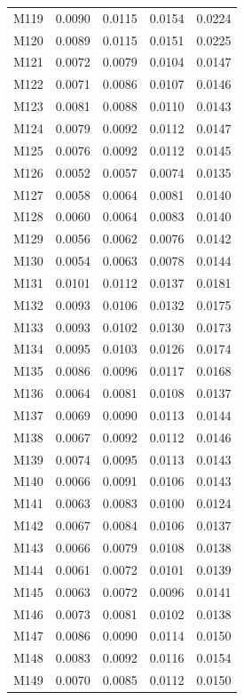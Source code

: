 \begin{longtable}{lrrrr}
M119 & 0.0090 & 0.0115 & 0.0154 & 0.0224 \\
M120 & 0.0089 & 0.0115 & 0.0151 & 0.0225 \\
M121 & 0.0072 & 0.0079 & 0.0104 & 0.0147 \\
M122 & 0.0071 & 0.0086 & 0.0107 & 0.0146 \\
M123 & 0.0081 & 0.0088 & 0.0110 & 0.0143 \\
M124 & 0.0079 & 0.0092 & 0.0112 & 0.0147 \\
M125 & 0.0076 & 0.0092 & 0.0112 & 0.0145 \\
M126 & 0.0052 & 0.0057 & 0.0074 & 0.0135 \\
M127 & 0.0058 & 0.0064 & 0.0081 & 0.0140 \\
M128 & 0.0060 & 0.0064 & 0.0083 & 0.0140 \\
M129 & 0.0056 & 0.0062 & 0.0076 & 0.0142 \\
M130 & 0.0054 & 0.0063 & 0.0078 & 0.0144 \\
M131 & 0.0101 & 0.0112 & 0.0137 & 0.0181 \\
M132 & 0.0093 & 0.0106 & 0.0132 & 0.0175 \\
M133 & 0.0093 & 0.0102 & 0.0130 & 0.0173 \\
M134 & 0.0095 & 0.0103 & 0.0126 & 0.0174 \\
M135 & 0.0086 & 0.0096 & 0.0117 & 0.0168 \\
M136 & 0.0064 & 0.0081 & 0.0108 & 0.0137 \\
M137 & 0.0069 & 0.0090 & 0.0113 & 0.0144 \\
M138 & 0.0067 & 0.0092 & 0.0112 & 0.0146 \\
M139 & 0.0074 & 0.0095 & 0.0113 & 0.0143 \\
M140 & 0.0066 & 0.0091 & 0.0106 & 0.0143 \\
M141 & 0.0063 & 0.0083 & 0.0100 & 0.0124 \\
M142 & 0.0067 & 0.0084 & 0.0106 & 0.0137 \\
M143 & 0.0066 & 0.0079 & 0.0108 & 0.0138 \\
M144 & 0.0061 & 0.0072 & 0.0101 & 0.0139 \\
M145 & 0.0063 & 0.0072 & 0.0096 & 0.0141 \\
M146 & 0.0073 & 0.0081 & 0.0102 & 0.0138 \\
M147 & 0.0086 & 0.0090 & 0.0114 & 0.0150 \\
M148 & 0.0083 & 0.0092 & 0.0116 & 0.0154 \\
M149 & 0.0070 & 0.0085 & 0.0112 & 0.0150 \\

\end{longtable}
